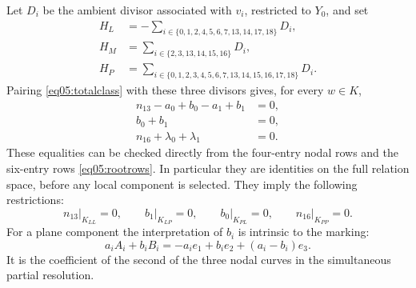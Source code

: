 Let $D_i$ be the ambient divisor associated with $v_i$, restricted to
$Y_0$, and set
\begin{equation}\label{eq05:divisors}
\begin{aligned}
 H_L&=-\sum_{i\in\{0,1,2,4,5,6,7,13,14,17,18\}}D_i,\\
 H_M&=\sum_{i\in\{2,3,13,14,15,16\}}D_i,\\
 H_P&=\sum_{i\in\{0,1,2,3,4,5,6,7,13,14,15,16,17,18\}}D_i.
\end{aligned}
\end{equation}
Pairing \eqref{eq05:totalclass} with these three divisors gives, for
every $w\in K$,
\begin{equation}\label{eq05:identities}
\begin{aligned}
 n_{13}-a_0+b_0-a_1+b_1&=0,\\
 b_0+b_1&=0,\\
 n_{16}+\lambda_0+\lambda_1&=0.
\end{aligned}
\end{equation}
These equalities can be checked directly from the four-entry nodal rows
and the six-entry rows \eqref{eq05:rootrows}.  In particular they are
identities on the full relation space, before any local component is
selected.  They imply the following restrictions:
\begin{equation}\label{eq05:forced}
 \left.n_{13}\right|_{K_{LL}}=0,\qquad
 \left.b_1\right|_{K_{LP}}=0,\qquad
 \left.b_0\right|_{K_{PL}}=0,\qquad
 \left.n_{16}\right|_{K_{PP}}=0.
\end{equation}
For a plane component the interpretation of $b_i$ is intrinsic to the
marking:
\begin{equation}\label{eq05:threecoefficients}
 a_iA_i+b_iB_i=-a_i e_1+b_i e_2+(a_i-b_i)e_3.
\end{equation}
It is the coefficient of the second of the three nodal curves in the
simultaneous partial resolution.

